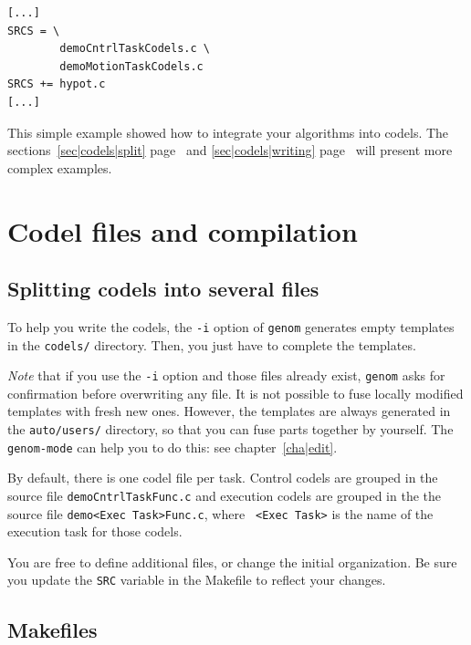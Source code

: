 \begin{center}\begin{cartouche}\small\begin{verbatim}
[...]
SRCS = \
        demoCntrlTaskCodels.c \
        demoMotionTaskCodels.c
SRCS += hypot.c
[...]
\end{verbatim}\end{cartouche}\end{center}

This simple example showed how to integrate  your algorithms into codels.
The sections~\ref{sec|codels|split} page~\pageref{sec|codels|split} and
\ref{sec|codels|writing} page~\pageref{sec|codels|writing} will present
more complex examples.


\section{Codel files and compilation}

\subsection{Splitting codels into several files}

To help you   write the  codels, the {\tt   -i}  option of  {\tt   genom}
generates empty templates in the {\tt  codels/} directory. Then, you just
have to complete the templates.

{\em Note}  that if you use the  {\tt -i} option  and those files already
exist, {\tt genom} asks for confirmation before  overwriting any file. It
is not possible to  fuse locally modified  templates with fresh new ones.
However, the   templates are always generated  in  the  {\tt auto/users/}
directory, so  that  you can fuse   parts together by  yourself. The {\tt
genom-mode} can help you to do this: see chapter~\ref{cha|edit}.

By default, there is one codel file per task.  Control codels are grouped
in the  source file  {\tt demoCntrlTaskFunc.c}  and execution  codels are
grouped  in the the source  file {\tt demo<Exec  Task>Func.c}, where {\tt
<Exec Task>} is the name of the execution task for those codels.

You are    free  to define   additional  files,  or  change  the  initial
organization.  Be sure you update the  {\tt SRC} variable in the Makefile
to reflect your changes.


\subsection{Makefiles}

